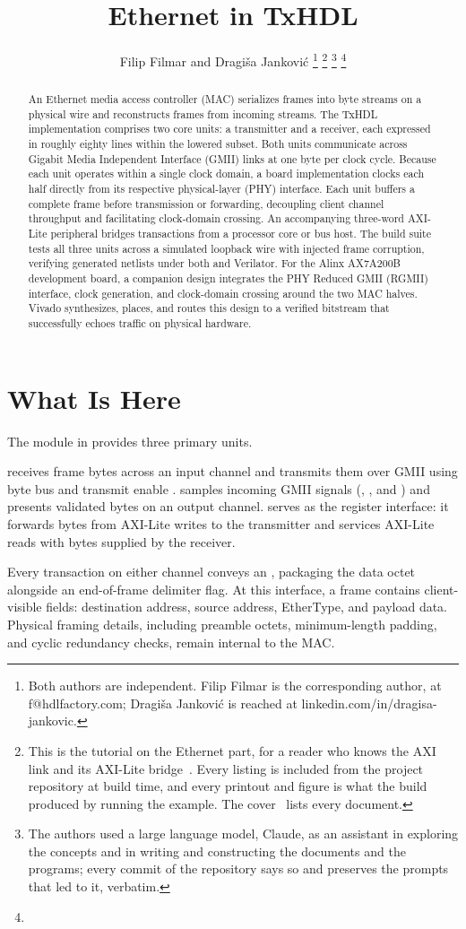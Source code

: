 \documentclass[journal,9pt]{IEEEtran}
\title{Ethernet in TxHDL}
\author{Filip Filmar and Dragiša Janković%
\thanks{Both authors are independent. Filip Filmar is the
corresponding author, at f@hdlfactory.com; Dragiša Janković is
reached at linkedin.com/in/dragisa-jankovic.}%
\thanks{This is the tutorial on the Ethernet part, for a reader who
knows the AXI link and its AXI-Lite bridge~\cite{axi}. Every listing is
included from the project repository \code{HDL/txhdl} at build time,
and every printout and figure is what the build produced by running
the example. The cover~\cite{cover} lists every document.}%
\thanks{The authors used a large language model, Claude, as an
assistant in exploring the concepts and in writing and constructing
the documents and the programs; every commit of the repository says
so and preserves the prompts that led to it, verbatim.}%
\thanks{\buildstamp}}
\begin{document}
\maketitle

\begin{abstract}
An Ethernet media access controller (MAC) serializes frames into byte
streams on a physical wire and reconstructs frames from incoming streams.
The TxHDL implementation comprises two core units: a transmitter and a
receiver, each expressed in roughly eighty lines within the lowered
subset. Both units communicate across Gigabit Media Independent Interface
(GMII) links at one byte per clock cycle. Because each unit operates
within a single clock domain, a board implementation clocks each half
directly from its respective physical-layer (PHY) interface. Each unit
buffers a complete frame before transmission or forwarding, decoupling
client channel throughput and facilitating clock-domain crossing. An
accompanying three-word AXI-Lite peripheral bridges transactions from a
processor core or bus host. The build suite tests all three units across a
simulated loopback wire with injected frame corruption, verifying generated
netlists under both  and Verilator. For the Alinx AX7A200B
development board, a companion design integrates the PHY Reduced GMII
(RGMII) interface, clock generation, and clock-domain crossing around the
two MAC halves. Vivado synthesizes, places, and routes this design to a
verified bitstream that successfully echoes traffic on physical hardware.
\end{abstract}

\section{What Is Here}
\label{sec:e-what}

The  module in  provides three primary units.

 receives frame bytes across an input channel and transmits them
over GMII using byte bus  and transmit enable .
 samples incoming GMII signals (, , and
) and presents validated bytes on an output channel.
 serves as the register interface: it forwards bytes from
AXI-Lite writes to the transmitter and services AXI-Lite reads with bytes
supplied by the receiver.

Every transaction on either channel conveys an , packaging
the data octet alongside an end-of-frame delimiter flag. At this interface,
a frame contains client-visible fields: destination address, source
address, EtherType, and payload data. Physical framing details, including
preamble octets, minimum-length padding, and cyclic redundancy checks,
remain internal to the MAC.
\end{document}
